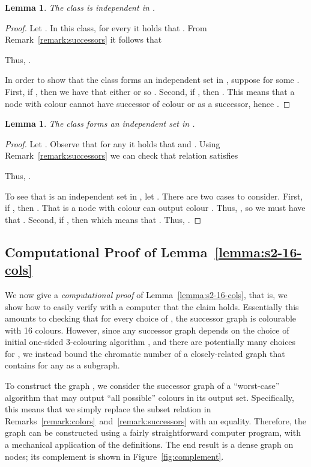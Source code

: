 \documentclass[a4paper,11pt]{article}
\newtheorem{lemma}[theorem]{Lemma}
\theoremstyle{remark}
\begin{document}
\begin{lemma}
The class  is independent in . 
\end{lemma} 
\begin{proof}
Let . In this class, for every  it holds that . From Remark~\ref{remark:successors} it follows that

Thus, . 

In order to show that the class  forms an independent set in , suppose  for some . First, if , then we have that either  or  so . Second, if , then . This means that a node with colour  cannot have successor of colour  or  as a successor, hence .
\end{proof}

\begin{lemma}
 The class  forms an independent set in .
\end{lemma}
\begin{proof}
 Let . Observe that for any  it holds that  and . Using Remark~\ref{remark:successors} we can check that relation  satisfies

Thus, . 

To see that  is an independent set in , let . There are two cases to consider. First, if , then . That is a node with colour  can output colour . Thus, , so we must have that . Second, if , then  which means that . Thus, .
\end{proof}


\subsection{Computational Proof of Lemma~\ref{lemma:s2-16-cols}}\label{sec:computer-proof}

We now give a \emph{computational proof} of Lemma~\ref{lemma:s2-16-cols}, that is, we show how to easily verify with a computer that the claim holds. Essentially this amounts to checking that for every choice of , the successor graph  is colourable with 16 colours. However, since any successor graph  depends on the choice of initial one-sided 3-colouring algorithm , and there are potentially many choices for , we instead bound the chromatic number of a closely-related graph  that contains  for any  as a subgraph. 

To construct the graph , we consider the successor graph of a ``worst-case'' algorithm that may output ``all possible'' colours in its output set. Specifically, this means that we simply replace the subset relation in Remarks~\ref{remark:colors}~and~\ref{remark:successors} with an equality. Therefore, the graph  can be constructed using a fairly straightforward computer program, with a mechanical application of the definitions. The end result is a dense graph on  nodes; its complement is shown in Figure~\ref{fig:complement}. 
\end{document}
